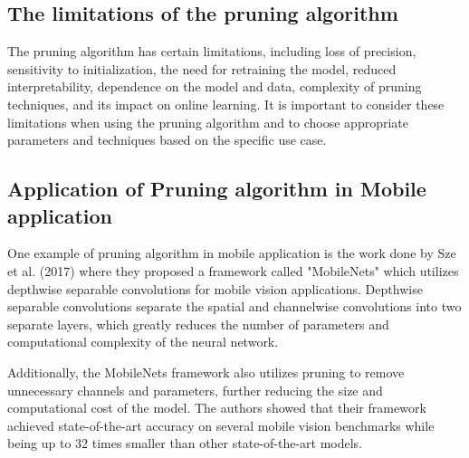 \subsection*{The limitations of the pruning algorithm}
The pruning algorithm has certain limitations, including loss of precision, sensitivity to initialization, the need for retraining the model, reduced interpretability, dependence on the model and data, complexity of pruning techniques, and its impact on online learning. It is important to consider these limitations when using the pruning algorithm and to choose appropriate parameters and techniques based on the specific use case.
\subsection*{Application of Pruning algorithm in Mobile application}
One example of pruning algorithm in mobile application is the work done by Sze et al. (2017) where they proposed a framework called "MobileNets" which utilizes depthwise separable convolutions for mobile vision applications. Depthwise separable convolutions separate the spatial and channelwise convolutions into two separate layers, which greatly reduces the number of parameters and computational complexity of the neural network.

Additionally, the MobileNets framework also utilizes pruning to remove unnecessary channels and parameters, further reducing the size and computational cost of the model. The authors showed that their framework achieved state-of-the-art accuracy on several mobile vision benchmarks while being up to 32 times smaller than other state-of-the-art models. \cite{ref55}


